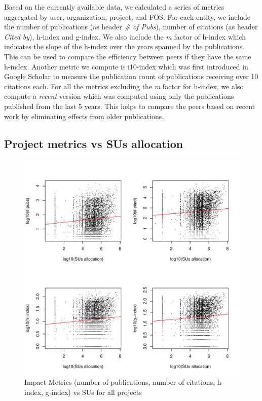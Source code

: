 \documentclass{sig-alternate}
\begin{document}
Based on the currently available data, we calculated a series of metrics aggregated by user, organization, project, and FOS.  For each entity, we include the number of publications (as header \emph{\# of Pubs}), number of citations (as header \emph{Cited by}), h-index and g-index. We also include the \emph{m} factor of h-index which indicates the slope of the h-index over the years spanned by the publications. This can be used to compare the efficiency between peers if they have the same h-index. Another metric we compute is i10-index \cite{www-i10index} which was first introduced in Google Scholar to measure the publication count of publications receiving over 10 citations each. For all the metrics excluding the \emph{m} factor for h-index, we also compute a \emph{recent} version which was computed using only the publications published from the last 5 years. This helps to compare the peers based on recent work by eliminating effects from older publications.

\subsection{Project metrics vs SUs allocation} 
 
\begin{figure}[!htb] 
  \centering 
    \includegraphics[width=1.0\columnwidth]{images/02_metrics_vs_alloc_proj.pdf} 
  \caption{Impact Metrics (number of publications, number of citations, h-index, g-index) vs SUs for all projects}\label{F:metrics-vs-alloc-proj} 
\end{figure} 
 
\end{document}

